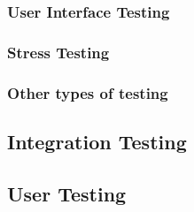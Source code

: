 \subsubsection{User Interface Testing}

\subsubsection{Stress Testing}

\subsubsection{Other types of testing}

\subsection{Integration Testing}

\subsection{User Testing}
